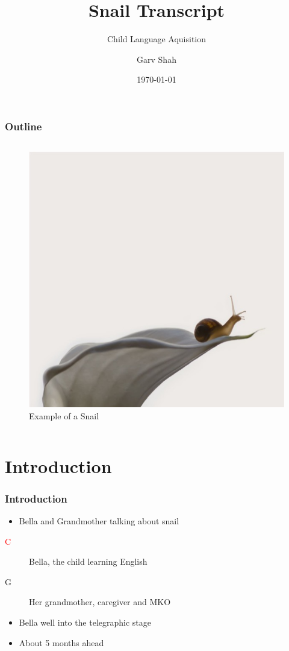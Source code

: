 \documentclass{beamer}
\title{Snail Transcript}
\subtitle{Child Language Aquisition}
\author{Garv Shah}
\institute{English Language}
\date{\today}
\begin{document}
\begin{frame}
\titlepage
\end{frame}

\begin{frame}
\frametitle{Outline}

\begin{columns}
	\tableofcontents

	\centering
	\begin{figure}
		\includegraphics[scale=0.3]{snail.jpg}
		\caption{Example of a Snail}
	\end{figure}
\end{columns}

\end{frame}

\section{Introduction}
\begin{frame}
	\frametitle{Introduction}

	\begin{itemize}
		\item Bella and Grandmother talking about snail
	\end{itemize}

	\begin{description}
	\item[\textcolor{red}{C}] Bella, the child learning English
	\item[G] Her grandmother, caregiver and MKO
	\end{description}

	\begin{itemize}
		\item Bella well into the telegraphic stage
		\item About 5 months ahead
	\end{itemize}
\end{frame}
\end{document}
